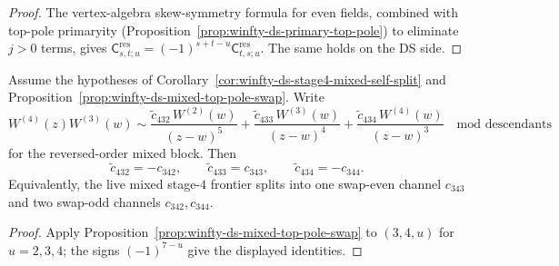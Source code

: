 \begin{proof}
The vertex-algebra skew-symmetry formula for even fields, combined with top-pole primaryity (Proposition~\ref{prop:winfty-ds-primary-top-pole}) to eliminate $j>0$ terms, gives $\mathsf{C}_{s,t;u}^{\mathrm{res}}=(-1)^{s+t-u}\mathsf{C}_{t,s;u}^{\mathrm{res}}$.  The same holds on the DS side.
\end{proof}

\begin{corollary}
\label{cor:winfty-ds-stage4-mixed-swap-parity}
Assume the hypotheses of
Corollary~\ref{cor:winfty-ds-stage4-mixed-self-split} and
Proposition~\ref{prop:winfty-ds-mixed-top-pole-swap}.  Write
\[
W^{(4)}(z)W^{(3)}(w)
\sim
\frac{\widetilde c_{432}\,W^{(2)}(w)}{(z-w)^5}
+\frac{\widetilde c_{433}\,W^{(3)}(w)}{(z-w)^4}
+\frac{\widetilde c_{434}\,W^{(4)}(w)}{(z-w)^3}
\quad\text{mod descendants}
\]
for the reversed-order mixed block.  Then
\[
\widetilde c_{432}=-c_{342},
\qquad
\widetilde c_{433}=c_{343},
\qquad
\widetilde c_{434}=-c_{344}.
\]
Equivalently, the live mixed stage-$4$ frontier splits into one
swap-even channel $c_{343}$ and two swap-odd channels
$c_{342},c_{344}$.
\end{corollary}

\begin{proof}
Apply Proposition~\ref{prop:winfty-ds-mixed-top-pole-swap} to $(3,4,u)$ for $u=2,3,4$; the signs $(-1)^{7-u}$ give the displayed identities.
\end{proof}

